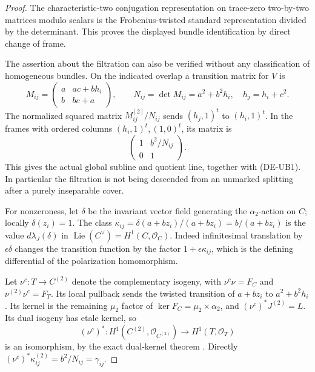 \begin{proof}
The characteristic-two conjugation representation on trace-zero
two-by-two matrices modulo scalars is the Frobenius-twisted standard
representation divided by the determinant. This proves the displayed
bundle identification by direct change of frame.

The assertion about the filtration can also be verified without any
classification of homogeneous bundles. On the indicated overlap a
transition matrix for \(V\) is
\[
 M_{ij}=\begin{pmatrix}
 a&ac+bh_i\\ b&bc+a
 \end{pmatrix},\qquad
 N_{ij}=\det M_{ij}=a^2+b^2h_i,
 \quad h_j=h_i+c^2.
\]
The normalized squared matrix \(M_{ij}^{[2]}/N_{ij}\) sends
\((h_j,1)^t\) to \((h_i,1)^t\). In the frames with ordered columns
\((h_i,1)^t,(1,0)^t\), its matrix is
\[
 \begin{pmatrix}1&b^2/N_{ij}\\0&1\end{pmatrix}.
\]
This gives the actual global subline and quotient line, together with
(DE-UB1). In particular the filtration is not being descended from an
unmarked splitting after a purely inseparable cover.

For nonzeroness, let \(\delta\) be the invariant vector field generating
the \(\alpha _2\)-action on \(C\); locally \(\delta(z_i)=1\).
The class
\(\kappa_{ij}=\delta(a+bz_i)/(a+bz_i)=b/(a+bz_i)\)
is the value \(d\lambda_J(\delta)\) in
\(\operatorname{Lie}(C^\vee)=H^1(C,\mathcal O_C)\).
Indeed infinitesimal translation by \(\epsilon\delta\) changes the
transition function by the factor \(1+\epsilon\kappa_{ij}\), which
is the defining differential of the polarization homomorphism.

Let \(\nu^c:T\to C^{(2)}\) denote the complementary isogeny, with
\(\nu^c\nu=F_C\) and \(\nu^{(2)}\nu^c=F_T\).
Its local pullback sends the twisted transition of \(a+bz_i\) to
\(a^2+b^2h_i\). Its kernel is the remaining \(\mu _2\) factor of
\(\ker F_C=\mu _2\times\alpha _2\), and
\((\nu^c)^*J^{(2)}=L\). Its dual isogeny has etale kernel, so
\[
 (\nu^c)^*:H^1(C^{(2)},\mathcal O_{C^{(2)}})
     \longrightarrow H^1(T,\mathcal O_T)
\]
is an isomorphism, by the exact dual-kernel theorem
\cite[Theorem~7.5 and proof, p.~100]{EdixhovenVanDerGeerMoonenAV}.
Directly
\((\nu^c)^*\kappa_{ij}^{(2)}=b^2/N_{ij}=\gamma_{ij}\).


\end{proof}
